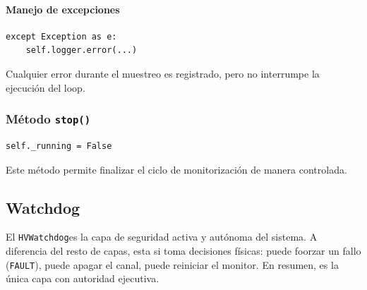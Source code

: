 \documentclass{article}
\begin{document}
\paragraph{Manejo de excepciones}

\begin{lstlisting}
except Exception as e:
    self.logger.error(...)
\end{lstlisting}

Cualquier error durante el muestreo es registrado, pero no interrumpe la ejecución del loop.


\subsubsection{Método \texttt{stop()}}

\begin{lstlisting}
self._running = False
\end{lstlisting}

Este método permite finalizar el ciclo de monitorización de manera controlada.

\subsection{Watchdog}

El \texttt{HVWatchdog}es la capa de seguridad activa y autónoma del sistema. A diferencia del resto de capas, esta si toma decisiones físicas: puede foorzar un fallo (\texttt{FAULT}), puede apagar el canal, puede reiniciar el monitor. En resumen, es la única capa con autoridad ejecutiva. 
\end{document}
